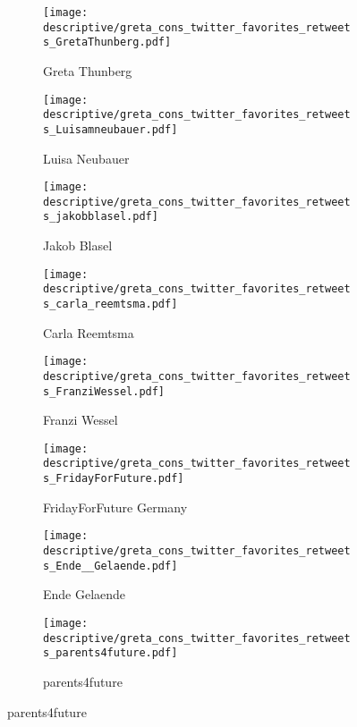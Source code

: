 \documentclass[11pt, a4paper]{article} %
\begin{document}
\begin{landscape}
	\begin{figure}[H]\centering
		\caption{Twitter feeds of important FFF icons}
		\begin{subfigure}[h]{0.23\linewidth}\centering\caption{Greta Thunberg}
			\texttt{[image: descriptive/greta\_cons\_twitter\_favorites\_retweets\_GretaThunberg.pdf]}
		\end{subfigure}
		\begin{subfigure}[h]{0.23\linewidth}\centering\caption{Luisa Neubauer}
			\texttt{[image: descriptive/greta\_cons\_twitter\_favorites\_retweets\_Luisamneubauer.pdf]}
		\end{subfigure}
		\begin{subfigure}[h]{0.23\linewidth}\centering\caption{Jakob Blasel}
			\texttt{[image: descriptive/greta\_cons\_twitter\_favorites\_retweets\_jakobblasel.pdf]}
		\end{subfigure}
		\begin{subfigure}[h]{0.23\linewidth}\centering\caption{Carla Reemtsma}
			\texttt{[image: descriptive/greta\_cons\_twitter\_favorites\_retweets\_carla\_reemtsma.pdf]}
		\end{subfigure}
		
		\begin{subfigure}[h]{0.23\linewidth}\centering\caption{Franzi Wessel}
			\texttt{[image: descriptive/greta\_cons\_twitter\_favorites\_retweets\_FranziWessel.pdf]}
		\end{subfigure}
		\begin{subfigure}[h]{0.23\linewidth}\centering\caption{FridayForFuture Germany}
			\texttt{[image: descriptive/greta\_cons\_twitter\_favorites\_retweets\_FridayForFuture.pdf]}
		\end{subfigure}
		\begin{subfigure}[h]{0.23\linewidth}\centering\caption{Ende Gelaende}
			\texttt{[image: descriptive/greta\_cons\_twitter\_favorites\_retweets\_Ende\_\_Gelaende.pdf]}
		\end{subfigure}
		\begin{subfigure}[h]{0.23\linewidth}\centering\caption{parents4future}
			\texttt{[image: descriptive/greta\_cons\_twitter\_favorites\_retweets\_parents4future.pdf]}
		\end{subfigure}
		

\end{figure}
\end{landscape}
\end{document}
